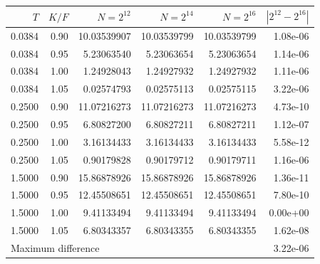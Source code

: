 \begin{tabular}{rrrrrr}
\toprule
$T$ & $K/F$ & $N=2^{12}$ & $N=2^{14}$ & $N=2^{16}$ & $|2^{12}-2^{16}|$\\
\midrule
0.0384 & 0.90 & 10.03539907 & 10.03539799 & 10.03539799 & 1.08e-06\\
0.0384 & 0.95 & 5.23063540 & 5.23063654 & 5.23063654 & 1.14e-06\\
0.0384 & 1.00 & 1.24928043 & 1.24927932 & 1.24927932 & 1.11e-06\\
0.0384 & 1.05 & 0.02574793 & 0.02575113 & 0.02575115 & 3.22e-06\\
0.2500 & 0.90 & 11.07216273 & 11.07216273 & 11.07216273 & 4.73e-10\\
0.2500 & 0.95 & 6.80827200 & 6.80827211 & 6.80827211 & 1.12e-07\\
0.2500 & 1.00 & 3.16134433 & 3.16134433 & 3.16134433 & 5.58e-12\\
0.2500 & 1.05 & 0.90179828 & 0.90179712 & 0.90179711 & 1.16e-06\\
1.5000 & 0.90 & 15.86878926 & 15.86878926 & 15.86878926 & 1.36e-11\\
1.5000 & 0.95 & 12.45508651 & 12.45508651 & 12.45508651 & 7.80e-10\\
1.5000 & 1.00 & 9.41133494 & 9.41133494 & 9.41133494 & 0.00e+00\\
1.5000 & 1.05 & 6.80343357 & 6.80343355 & 6.80343355 & 1.62e-08\\
\midrule
\multicolumn{5}{l}{Maximum difference} & 3.22e-06\\
\bottomrule
\end{tabular}
